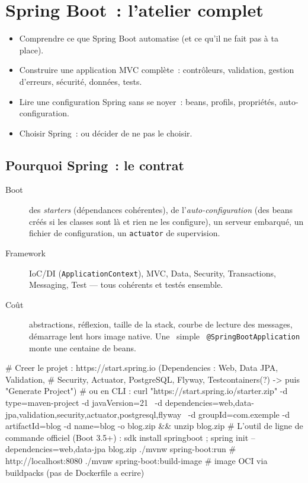 \chapter{Spring Boot~: l'atelier complet}
\label{ch-java-spring}

\begin{objectif}
\begin{itemize}
  \item Comprendre ce que Spring Boot automatise (et ce qu'il ne fait pas \`a ta place).
  \item Construire une application MVC compl\`ete~: contr\^oleurs, validation, gestion d'erreurs,
        s\'ecurit\'e, donn\'ees, tests.
  \item Lire une configuration Spring sans se noyer~: beans, profils, propri\'et\'es, auto-configuration.
  \item Choisir Spring~: ou d\'ecider de ne pas le choisir.
\end{itemize}
\end{objectif}

\section{Pourquoi Spring~: le contrat}

\begin{description}
  \item[Boot] des \emph{starters} (d\'ependances coh\'erentes), de l'\emph{auto-configuration} (des beans
        cr\'e\'es si les classes sont l\`a et rien ne les configure), un serveur embarqu\'e, un fichier
        de configuration, un \verb|actuator| de supervision.
  \item[Framework] IoC/DI (\verb|ApplicationContext|), MVC, Data, Security, Transactions, Messaging,
        Test --- tous coh\'erents et test\'es ensemble.
  \item[Co\^ut] abstractions, r\'eflexion, taille de la stack, courbe de lecture des messages,
        d\'emarrage lent hors image native. Une \og ~simple~ \fg{} \verb|@SpringBootApplication| monte
        une centaine de beans.
\end{description}

\begin{terminal}
# Creer le projet : https://start.spring.io (Dependencies : Web, Data JPA, Validation,
#   Security, Actuator, PostgreSQL, Flyway, Testcontainers(?) -> puis "Generate Project")
# ou en CLI :
curl "https://start.spring.io/starter.zip" -d type=maven-project -d javaVersion=21 \
  -d dependencies=web,data-jpa,validation,security,actuator,postgresql,flyway \
  -d groupId=com.exemple -d artifactId=blog -d name=blog -o blog.zip && unzip blog.zip
# L'outil de ligne de commande officiel (Boot 3.5+) :
sdk install springboot ; spring init --dependencies=web,data-jpa blog.zip
./mvnw spring-boot:run          # http://localhost:8080
./mvnw spring-boot:build-image  # image OCI via buildpacks (pas de Dockerfile a ecrire)
\end{terminal}

